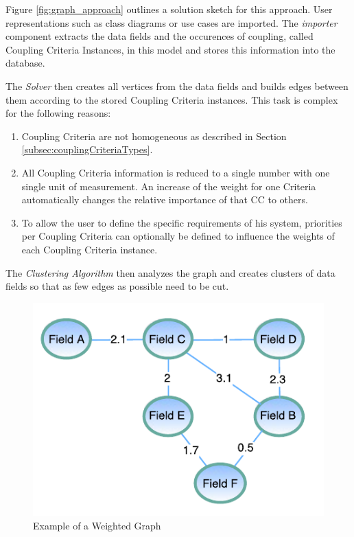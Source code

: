 \begin{minipage}[t]{0.5\textwidth}
	Figure \ref{fig:graph_approach} outlines a solution sketch for this approach. User representations such as class diagrams or use cases are imported. The \textit{importer} component extracts the data fields and the occurences of coupling, called Coupling Criteria Instances, in this model and stores this information into the database.
	
	The \textit{Solver} then creates all vertices from the data fields and builds edges between them according to the stored Coupling Criteria instances. This task is complex for the following reasons:
	
	\begin{enumerate}
		\item Coupling Criteria are not homogeneous as described in Section \ref{subsec:couplingCriteriaTypes}. 
		
		\item All Coupling Criteria information is reduced to a single number with one single unit of measurement. An increase of the weight for one Criteria automatically changes the relative importance of that CC to others.
		
		\item To allow the user to define the specific requirements of his system, priorities per Coupling Criteria can optionally be defined to influence the weights of each Coupling Criteria instance.
	\end{enumerate}
	
	The \textit{Clustering Algorithm} then analyzes the graph and creates clusters of data fields so that as few edges as possible need to be cut.
	
	\begin{figure}[H]
		\includegraphics[scale=1.0]{diagrams/weighted_graph.pdf}
		\caption{Example of a Weighted Graph}
		\label{fig:weighted_graph}
	\end{figure}

\end{minipage}
